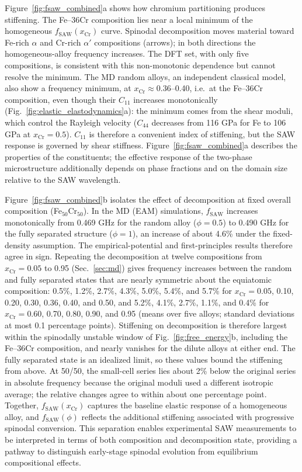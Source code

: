 \documentclass[final,3p,times]{elsarticle}
\begin{document}
Figure~\ref{fig:fsaw_combined}a shows how chromium partitioning produces stiffening. The Fe--36Cr composition lies near a local minimum of the homogeneous $f_{\mathrm{SAW}}(x_{\mathrm{Cr}})$ curve. Spinodal decomposition moves material toward Fe-rich $\alpha$ and Cr-rich $\alpha'$ compositions (arrows); in both directions the homogeneous-alloy frequency increases. The DFT set, with only five compositions, is consistent with this non-monotonic dependence but cannot resolve the minimum. The MD random alloys, an independent classical model, also show a frequency minimum, at $x_{\mathrm{Cr}}\approx0.36$--0.40, i.e.\ at the Fe--36Cr composition, even though their $C_{11}$ increases monotonically (Fig.~\ref{fig:elastic_elastodynamics}a): the minimum comes from the shear moduli, which control the Rayleigh velocity ($C_{44}$ decreases from 116 GPa for Fe to 106 GPa at $x_{\mathrm{Cr}}=0.5$). $C_{11}$ is therefore a convenient index of stiffening, but the SAW response is governed by shear stiffness. Figure~\ref{fig:fsaw_combined}a describes the properties of the constituents; the effective response of the two-phase microstructure additionally depends on phase fractions and on the domain size relative to the SAW wavelength.

Figure~\ref{fig:fsaw_combined}b isolates the effect of decomposition at fixed overall composition (Fe$_{50}$Cr$_{50}$). In the MD (EAM) simulations, $f_{\mathrm{SAW}}$ increases monotonically from 0.469 GHz for the random alloy ($\phi=0.5$) to 0.490 GHz for the fully separated structure ($\phi=1$), an increase of about 4.6\% under the fixed-density assumption. The empirical-potential and first-principles results therefore agree in sign. Repeating the decomposition at twelve compositions from $x_{\mathrm{Cr}}=0.05$ to 0.95 (Sec.~\ref{sec:md}) gives frequency increases between the random and fully separated states that are nearly symmetric about the equiatomic composition: 0.5\%, 1.2\%, 2.7\%, 4.3\%, 5.0\%, 5.4\%, and 5.7\% for $x_{\mathrm{Cr}}=0.05$, 0.10, 0.20, 0.30, 0.36, 0.40, and 0.50, and 5.2\%, 4.1\%, 2.7\%, 1.1\%, and 0.4\% for $x_{\mathrm{Cr}}=0.60$, 0.70, 0.80, 0.90, and 0.95 (means over five alloys; standard deviations at most 0.1 percentage points). Stiffening on decomposition is therefore largest within the spinodally unstable window of Fig.~\ref{fig:free_energy}b, including the Fe--36Cr composition, and nearly vanishes for the dilute alloys at either end. The fully separated state is an idealized limit, so these values bound the stiffening from above. At 50/50, the small-cell series lies about 2\% below the original series in absolute frequency because the original moduli used a different isotropic average; the relative changes agree to within about one percentage point. Together, $f_{\mathrm{SAW}}(x_{\mathrm{Cr}})$ captures the baseline elastic response of a homogeneous alloy, and $f_{\mathrm{SAW}}(\phi)$ reflects the additional stiffening associated with progressive spinodal conversion. This separation enables experimental SAW measurements to be interpreted in terms of both composition and decomposition state, providing a pathway to distinguish early-stage spinodal evolution from equilibrium compositional effects.
\end{document}
